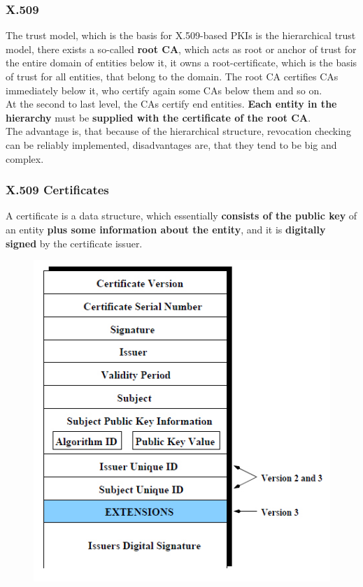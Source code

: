 \documentclass[a4paper, 10 pt, conference]{ieeeconf}
\begin{document}
\subsubsection{\textbf{X.509}}
The trust model, which is the basis for X.509-based PKIs is the hierarchical trust model, there exists a so-called \textbf{root CA}, which acts as root or anchor of trust for the entire domain of entities below it, it owns a root-certificate, which is the basis of trust for all entities, that belong to the domain. The root CA certifies CAs immediately below it, who certify again some CAs below them and so on. \\
At the second to last level, the CAs certify end entities. \textbf{Each entity in the hierarchy} must be \textbf{supplied with the certificate of the root CA}. \\
The advantage is, that because of the hierarchical structure, revocation checking can be reliably implemented, disadvantages are, that they tend to be big and complex.

\vspace{0.5cm}
\subsubsection{\textbf{X.509 Certificates}}
A certificate is a data structure, which essentially \textbf{consists of the public key} of an entity \textbf{plus some information about the entity}, and it is \textbf{digitally signed} by the certificate issuer. 
\begin{figure}[h!]
\centering
\includegraphics[scale=0.44]{images/diagrams/x509.jpg} 
\end{figure}
\end{document}
